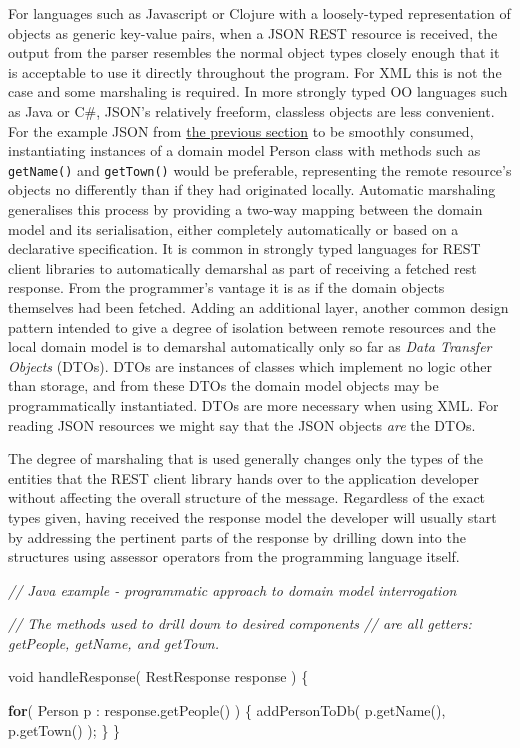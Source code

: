 \documentclass[]{article}
\newenvironment{Shaded}{}{}
\newcommand{\KeywordTok}[1]{\textcolor[rgb]{0.00,0.44,0.13}{\textbf{{#1}}}}
\newcommand{\DataTypeTok}[1]{\textcolor[rgb]{0.56,0.13,0.00}{{#1}}}
\newcommand{\CommentTok}[1]{\textcolor[rgb]{0.38,0.63,0.69}{\textit{{#1}}}}
\newcommand{\FunctionTok}[1]{\textcolor[rgb]{0.02,0.16,0.49}{{#1}}}
\newcommand{\NormalTok}[1]{{#1}}
\begin{document}
For languages such as Javascript or Clojure with a loosely-typed
representation of objects as generic key-value pairs, when a JSON REST
resource is received, the output from the parser resembles the normal
object types closely enough that it is acceptable to use it directly
throughout the program. For XML this is not the case and some marshaling
is required. In more strongly typed OO languages such as Java or C\#,
JSON's relatively freeform, classless objects are less convenient. For
the example JSON from \hyperref[jsonxml2]{the previous section} to be
smoothly consumed, instantiating instances of a domain model Person
class with methods such as \texttt{getName()} and \texttt{getTown()}
would be preferable, representing the remote resource's objects no
differently than if they had originated locally. Automatic marshaling
generalises this process by providing a two-way mapping between the
domain model and its serialisation, either completely automatically or
based on a declarative specification. It is common in strongly typed
languages for REST client libraries to automatically demarshal as part
of receiving a fetched rest response. From the programmer's vantage it
is as if the domain objects themselves had been fetched. Adding an
additional layer, another common design pattern intended to give a
degree of isolation between remote resources and the local domain model
is to demarshal automatically only so far as \emph{Data Transfer
Objects} (DTOs). DTOs are instances of classes which implement no logic
other than storage, and from these DTOs the domain model objects may be
programmatically instantiated. DTOs are more necessary when using XML.
For reading JSON resources we might say that the JSON objects \emph{are}
the DTOs.

The degree of marshaling that is used generally changes only the types
of the entities that the REST client library hands over to the
application developer without affecting the overall structure of the
message. Regardless of the exact types given, having received the
response model the developer will usually start by addressing the
pertinent parts of the response by drilling down into the structures
using assessor operators from the programming language itself.

\begin{Shaded}
\begin{Highlighting}[]
\CommentTok{// Java example - programmatic approach to domain model interrogation }

\CommentTok{// The methods used to drill down to desired components }
\CommentTok{// are all getters: getPeople, getName, and getTown.}
 
\DataTypeTok{void} \FunctionTok{handleResponse}\NormalTok{( RestResponse response ) \{}

   \KeywordTok{for}\NormalTok{( Person p : response.}\FunctionTok{getPeople}\NormalTok{() ) \{}
      \FunctionTok{addPersonToDb}\NormalTok{( p.}\FunctionTok{getName}\NormalTok{(), p.}\FunctionTok{getTown}\NormalTok{() );}
   \NormalTok{\}   }
\NormalTok{\}}
\end{Highlighting}
\end{Shaded}
\end{document}

